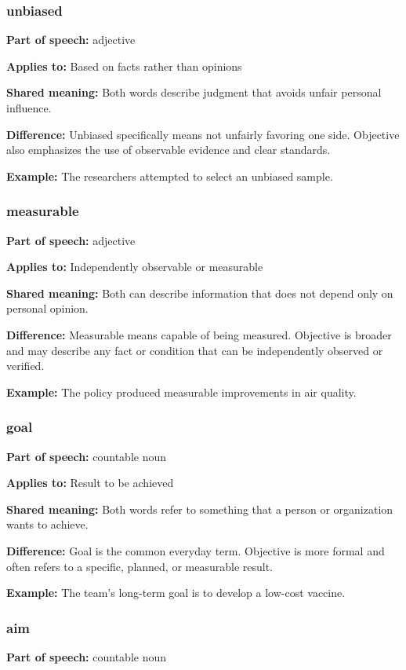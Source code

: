 \documentclass[11pt]{article}
\begin{document}
\subsubsection{unbiased}
\textbf{Part of speech:} adjective

\textbf{Applies to:} Based on facts rather than opinions

\textbf{Shared meaning:} Both words describe judgment that avoids unfair personal influence.

\textbf{Difference:} Unbiased specifically means not unfairly favoring one side. Objective also emphasizes the use of observable evidence and clear standards.

\textbf{Example:} The researchers attempted to select an unbiased sample.

\subsubsection{measurable}
\textbf{Part of speech:} adjective

\textbf{Applies to:} Independently observable or measurable

\textbf{Shared meaning:} Both can describe information that does not depend only on personal opinion.

\textbf{Difference:} Measurable means capable of being measured. Objective is broader and may describe any fact or condition that can be independently observed or verified.

\textbf{Example:} The policy produced measurable improvements in air quality.

\subsubsection{goal}
\textbf{Part of speech:} countable noun

\textbf{Applies to:} Result to be achieved

\textbf{Shared meaning:} Both words refer to something that a person or organization wants to achieve.

\textbf{Difference:} Goal is the common everyday term. Objective is more formal and often refers to a specific, planned, or measurable result.

\textbf{Example:} The team's long-term goal is to develop a low-cost vaccine.

\subsubsection{aim}
\textbf{Part of speech:} countable noun
\end{document}
